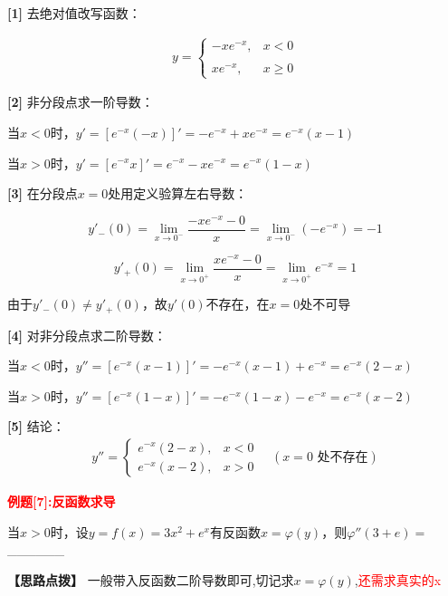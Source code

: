 \documentclass[11pt,a4paper,UTF8]{ctexart}
\begin{document}
\begin{solbox}[分步推导与答题规范]
\textbf{[1]} 去绝对值改写函数：

  
\begin{align*}
y = \begin{cases} -xe^{-x}, & x < 0 \\ \\xe^{-x}, & x \ge 0 \end{cases}
\end{align*}


\textbf{[2]} 非分段点求一阶导数：

  当$x < 0$时，$y' = [e^{-x}(-x)]' = -e^{-x} + xe^{-x} = e^{-x}(x - 1)$

  当$x > 0$时，$y' = [e^{-x}x]' = e^{-x} - xe^{-x} = e^{-x}(1 - x)$

\textbf{[3]} 在分段点$x=0$处用定义验算左右导数：

  
\begin{equation*}
y'_-(0) = \lim_{x \to 0^-} \frac{-xe^{-x} - 0}{x} = \lim_{x \to 0^-} (-e^{-x}) = -1
\end{equation*}


  
\begin{equation*}
y'_+(0) = \lim_{x \to 0^+} \frac{xe^{-x} - 0}{x} = \lim_{x \to 0^+} e^{-x} = 1
\end{equation*}


  由于$y'_-(0) \neq y'_+(0)$，故$y'(0)$不存在，在$x=0$处不可导

\textbf{[4]} 对非分段点求二阶导数：

  当$x < 0$时，$y'' = [e^{-x}(x - 1)]' = -e^{-x}(x - 1) + e^{-x} = e^{-x}(2 - x)$

  当$x > 0$时，$y'' = [e^{-x}(1 - x)]' = -e^{-x}(1 - x) - e^{-x} = e^{-x}(x - 2)$

\textbf{[5]} 结论：
\begin{align*}
y'' = \begin{cases} e^{-x}(2 - x), & x < 0 \\ e^{-x}(x - 2), & x > 0 \end{cases} \quad (x=0 \text{ 处不存在})
\end{align*}

\end{solbox}

\textbf{\textcolor{red}{例题[7]:反函数求导}}

当$x > 0$时，设$y = f(x) = 3x^2 + e^x$有反函数$x = \varphi(y)$，则$\varphi''(3+e) =$\_\_\_\_\_\_

\textbf{\color{DeepPurple}【思路点拨】} 一般带入反函数二阶导数即可,切记求$x=\varphi(y)$,\textcolor{red}{还需求真实的x}
\end{document}
